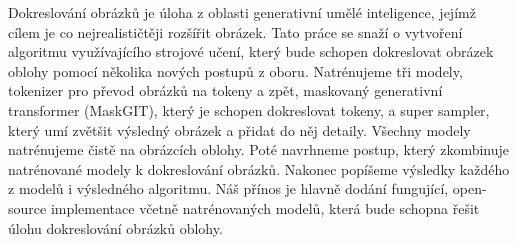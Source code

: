 \documentclass[12pt]{report}
\begin{document}

Dokreslování obrázků je úloha z oblasti generativní umělé inteligence, jejímž cílem je co nejrealističtěji rozšířit obrázek. Tato práce se snaží o vytvoření algoritmu využívajícího strojové učení, který bude schopen dokreslovat obrázek oblohy pomocí několika nových postupů z oboru. Natrénujeme tři modely, tokenizer pro převod obrázků na tokeny a zpět, maskovaný generativní transformer (MaskGIT), který je schopen dokreslovat tokeny, a super sampler, který umí zvětšit výsledný obrázek a přidat do něj detaily. Všechny modely natrénujeme čistě na obrázcích oblohy. Poté navrhneme postup, který zkombinuje natrénované modely k dokreslování obrázků. Nakonec popíšeme výsledky každého z modelů i výsledného algoritmu. Náš přínos je hlavně dodání fungující, open-source implementace včetně natrénovaných modelů, která bude schopna řešit úlohu dokreslování obrázků oblohy.
\end{document}
